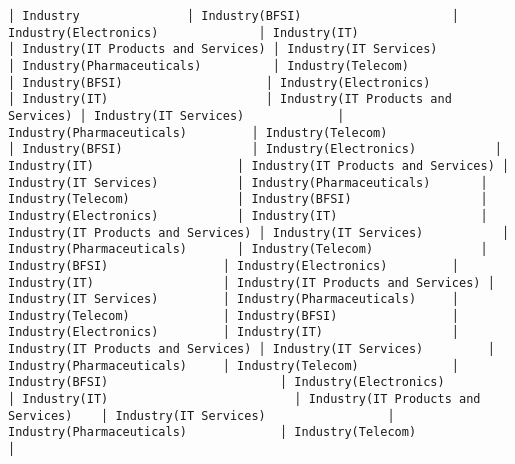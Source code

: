 \documentclass[11pt]{article}
\begin{document}
\begin{Verbatim}[commandchars=\\\{\}]
│ Industry               │ Industry(BFSI)                     │ Industry(Electronics)              │ Industry(IT)                       │ Industry(IT Products and Services) │ Industry(IT Services)              │ Industry(Pharmaceuticals)          │ Industry(Telecom)                  │ Industry(BFSI)                    │ Industry(Electronics)             │ Industry(IT)                      │ Industry(IT Products and Services) │ Industry(IT Services)             │ Industry(Pharmaceuticals)         │ Industry(Telecom)                 │ Industry(BFSI)                  │ Industry(Electronics)           │ Industry(IT)                    │ Industry(IT Products and Services) │ Industry(IT Services)           │ Industry(Pharmaceuticals)       │ Industry(Telecom)               │ Industry(BFSI)                  │ Industry(Electronics)           │ Industry(IT)                    │ Industry(IT Products and Services) │ Industry(IT Services)           │ Industry(Pharmaceuticals)       │ Industry(Telecom)               │ Industry(BFSI)                │ Industry(Electronics)         │ Industry(IT)                  │ Industry(IT Products and Services) │ Industry(IT Services)         │ Industry(Pharmaceuticals)     │ Industry(Telecom)             │ Industry(BFSI)                │ Industry(Electronics)         │ Industry(IT)                  │ Industry(IT Products and Services) │ Industry(IT Services)         │ Industry(Pharmaceuticals)     │ Industry(Telecom)             │ Industry(BFSI)                        │ Industry(Electronics)                 │ Industry(IT)                          │ Industry(IT Products and Services)    │ Industry(IT Services)                 │ Industry(Pharmaceuticals)             │ Industry(Telecom)                     │

\end{Verbatim}
\end{document}
